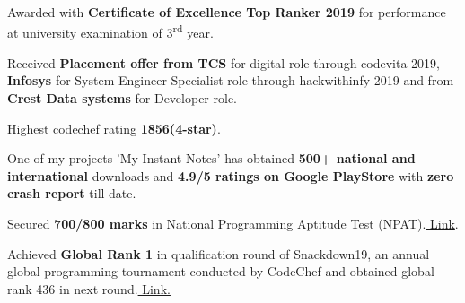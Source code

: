 \noindent



  \begin{cventries}

\begin{cvitems} %
\item{ {\fontsize{9pt}{1em}\bodyfontlight\upshape\color{text} Awarded with \textbf{Certificate of Excellence Top Ranker 2019 }for performance at university examination of 3\textsuperscript{rd} year.}}
\item{{\fontsize{9pt}{1em}\bodyfontlight\upshape\color{text} Received \textbf{Placement offer from TCS} for digital role through codevita 2019,  \textbf{Infosys} for System Engineer Specialist role through hackwithinfy 2019 and from \textbf{Crest Data systems} for Developer role.}}
\item{{\fontsize{9pt}{1em}\bodyfontlight\upshape\color{text}Highest codechef rating \textbf{1856(4-star)}}.}
\item{{\fontsize{9pt}{1em}\bodyfontlight\upshape\color{text} One of my projects 'My Instant Notes' has obtained \textbf{500+ national and international} downloads and \textbf{4.9/5 ratings on Google PlayStore} with \textbf{zero crash report} till date.}}
 \item {\fontsize{9pt}{1em}\bodyfontlight\upshape\color{text} Secured \textbf{700/800 marks }in National Programming Aptitude Test (NPAT).\href{https://drive.google.com/open?id=19GsoeP4D9Bw4d8MdDmASp_mzMwAXBJOp}{ Link}.}
 \item {{\fontsize{9pt}{1em}\bodyfontlight\upshape\color{text} Achieved\textbf{ Global Rank 1} in qualification round of Snackdown19, an annual global programming tournament conducted by CodeChef and obtained global rank 436 in next round.\href{https://www.codechef.com/certificates/public/769487e}{ Link.}}}

\end{cvitems}
\end{cventries}
